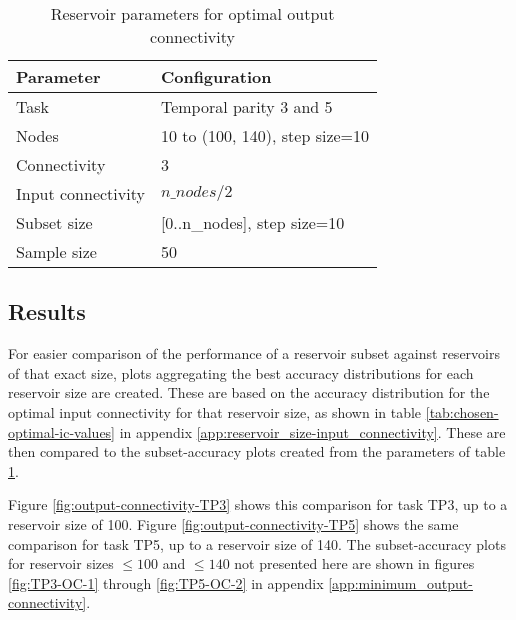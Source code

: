 \begin{table}[ht]
    \centering
    \caption{Reservoir parameters for optimal output connectivity}
    \label{tab:oc-reservoir-parameters}
    \begin{tabular}{ll}
        \hline
        \textbf{Parameter} & \textbf{Configuration} \\
        \hline
        \hline
        Task                & Temporal parity 3 and 5        \\
        Nodes               & 10 to (100, 140), step size=10 \\
        Connectivity        & 3                              \\
        Input connectivity  & $ n\_nodes / 2 $               \\
        Subset size         & [0..n\_nodes], step size=10    \\
        Sample size         & 50 \\
        \hline
    \end{tabular}
\end{table}

\subsection{Results}

For easier comparison of the performance of a reservoir subset against reservoirs of that exact size,
plots aggregating the best accuracy distributions for each reservoir size are created.
These are based on the accuracy distribution for the optimal input connectivity for that reservoir size,
as shown in table \ref{tab:chosen-optimal-ic-values} in appendix \ref{app:reservoir_size-input_connectivity}.
These are then compared to the subset-accuracy plots created from the parameters of table \ref{tab:oc-reservoir-parameters}.

Figure \ref{fig:output-connectivity-TP3} shows this comparison for task TP3, up to a reservoir size of 100.
Figure \ref{fig:output-connectivity-TP5} shows the same comparison for task TP5, up to a reservoir size of 140.
The subset-accuracy plots for reservoir sizes $ \le 100 $ and $ \le 140 $ not presented here are shown in figures \ref{fig:TP3-OC-1} through \ref{fig:TP5-OC-2} in appendix \ref{app:minimum_output-connectivity}.

